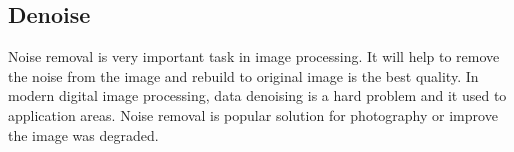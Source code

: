 \subsection*{Denoise}

Noise removal is very important task in image processing. It will help to remove the noise from the image and rebuild to original image is the best quality. In modern digital image processing, data denoising is a hard problem and it used to application areas. Noise removal is popular solution for photography or improve the image was degraded.








 


